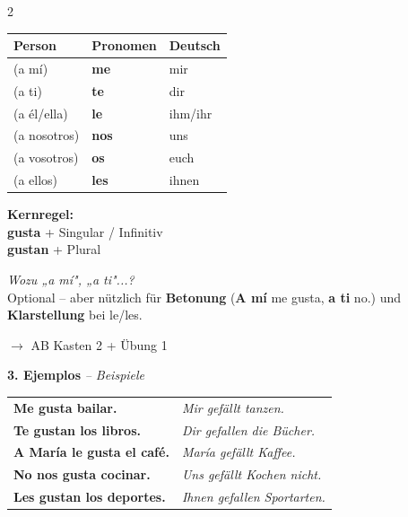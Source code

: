 \documentclass[10pt, a4paper]{article}
\newcommand{\seriftext}[1]{{\fontfamily{ppl}\selectfont #1}}
\newcommand{\es}[1]{\seriftext{\textbf{#1}}}
\newcommand{\de}[1]{\textit{\textcolor{akzent}{#1}}}
\newcommand{\abmark}[1]{{\footnotesize\textcolor{spanisch}{$\rightarrow$ AB #1}}}
\newcommand{\abschnitt}[2]{\noindent\textbf{\large #1. #2}}
\begin{document}
\begin{multicols}{2}
\vspace{4pt}

{\small
\begin{tabular}{@{}lll@{}}
\textbf{Person} & \textbf{Pronomen} & \textbf{Deutsch} \\
\midrule
(a mí) & \es{me} & mir \\
(a ti) & \es{te} & dir \\
(a él/ella) & \es{le} & ihm/ihr \\
(a nosotros) & \es{nos} & uns \\
(a vosotros) & \es{os} & euch \\
(a ellos) & \es{les} & ihnen \\
\end{tabular}}

\vspace{6pt}

\begin{merkbox}
\textbf{Kernregel:}\\
\es{gusta} + Singular / Infinitiv\\
\es{gustan} + Plural
\end{merkbox}

\vspace{4pt}

\begin{tippbox}
{\footnotesize\textit{Wozu „a mí", „a ti"...?}\\
Optional -- aber nützlich für \textbf{Betonung} (\es{A mí} me gusta, \es{a ti} no.) und \textbf{Klarstellung} bei le/les.}
\end{tippbox}

\vspace{4pt}

\abmark{Kasten 2 + Übung 1}

\columnbreak

\abschnitt{3}{Ejemplos} \de{-- Beispiele}

\vspace{4pt}

{\small
\begin{tabular}{@{}l@{ }l@{}}
\es{Me gusta bailar.} & \de{Mir gefällt tanzen.} \\[3pt]
\es{Te gustan los libros.} & \de{Dir gefallen die Bücher.} \\[3pt]
\es{A María le gusta el café.} & \de{María gefällt Kaffee.} \\[3pt]
\es{No nos gusta cocinar.} & \de{Uns gefällt Kochen nicht.} \\[3pt]
\es{Les gustan los deportes.} & \de{Ihnen gefallen Sportarten.} \\
\end{tabular}}


\end{multicols}
\end{document}
